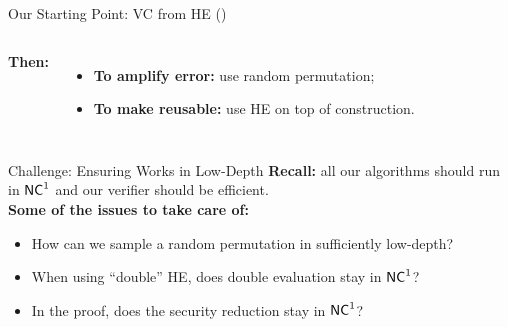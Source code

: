 \begin{frame}[t]{Our Starting Point: VC from HE (\cite{ckv10})}
	\onslide<2->
\begin{columns}
	\textbf{Then:}
	\begin{itemize}
		\item \textbf{To amplify error:} use random permutation;
			\onslide<4->
		\item \textbf{To make reusable:} use HE  on top of construction.
	\end{itemize}
	
	\end{columns}
\end{frame}


\begin{frame}[t]{Challenge: Ensuring \cite{ckv10} Works in Low-Depth}
	\textbf{Recall:} all our algorithms should run in ${\mathsf{NC}}^1$ and our verifier should be efficient.\pause\\
	\bigskip
	\textbf{Some of the issues to take care of: }
	\begin{itemize}[<+- | alert@+>]
		\item How can we sample a random permutation in sufficiently low-depth?
		\item When using ``double'' HE, does double evaluation stay in ${\mathsf{NC}}^1$?
		\item In the proof, does the security reduction stay in ${\mathsf{NC}}^1$?
	\end{itemize}
\end{frame}

